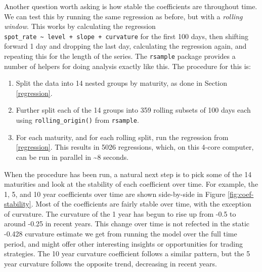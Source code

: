 \documentclass[openany]{book}
\providecommand{\tightlist}{%
  \setlength{\itemsep}{0pt}\setlength{\parskip}{0pt}}
\theoremstyle{definition}
\theoremstyle{definition}
\theoremstyle{definition}
\theoremstyle{remark}
\begin{document}
Another question worth asking is how stable the coefficients are
throughout time. We can test this by running the same regression as
before, but with a \emph{rolling window}. This works by calculating the
regression
\texttt{spot\_rate\ \textasciitilde{}\ level\ +\ slope\ +\ curvature}
for the first 100 days, then shifting forward 1 day and dropping the
last day, calculating the regression again, and repeating this for the
length of the series. The \texttt{rsample} package provides a number of
helpers for doing analysis exactly like this. The procedure for this is:

\begin{enumerate}
\def\labelenumi{\arabic{enumi})}
\tightlist
\item
  Split the data into 14 nested groups by maturity, as done in Section
  \ref{regression}.
\item
  Further split each of the 14 groups into 359 rolling subsets of 100
  days each using \texttt{rolling\_origin()} from \texttt{rsample}.
\item
  For each maturity, and for each rolling split, run the regression from
  \ref{regression}. This results in 5026 regressions, which, on this
  4-core computer, can be run in parallel in \textasciitilde{}8 seconds.
\end{enumerate}

\small

\normalsize

\small

\normalsize

\small

\normalsize

When the procedure has been run, a natural next step is to pick some of
the 14 maturities and look at the stability of each coefficient over
time. For example, the 1, 5, and 10 year coefficients over time are
shown side-by-side in Figure \ref{fig:coef-stability}. Most of the
coefficients are fairly stable over time, with the exception of
curvature. The curvature of the 1 year has begun to rise up from -0.5 to
around -0.25 in recent years. This change over time is not refected in
the static -0.428 curvature estimate we get from running the model over
the full time period, and might offer other interesting insights or
opportunities for trading strategies. The 10 year curvature coefficient
follows a similar pattern, but the 5 year curvature follows the opposite
trend, decreasing in recent years.

\small

\normalsize
\end{document}
